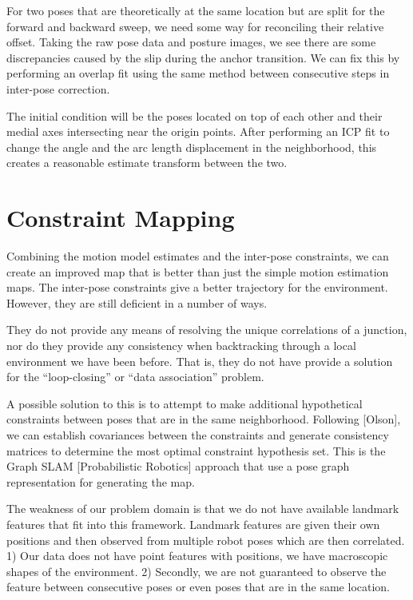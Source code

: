 For two poses that are theoretically at the same location but are split for the forward and backward sweep, we need some way for reconciling their relative offset. Taking the raw pose data and posture images, we see there are some discrepancies caused by the slip during the anchor transition. We can fix this by performing an overlap fit using the same method between consecutive steps in inter-pose correction.

The initial condition will be the poses located on top of each other and their medial axes intersecting near the origin points. After performing an ICP fit to change the angle and the arc length displacement in the neighborhood, this creates a reasonable estimate transform between the two.

\section{Constraint Mapping}
\label{constraintmapping}

Combining the motion model estimates and the inter-pose constraints, we can create an improved map that is better than just the simple motion estimation maps. The inter-pose constraints give a better trajectory for the environment. However, they are still deficient in a number of ways.

They do not provide any means of resolving the unique correlations of a junction, nor do they provide any consistency when backtracking through a local environment we have been before. That is, they do not have provide a solution for the “loop-closing” or “data association” problem.

A possible solution to this is to attempt to make additional hypothetical constraints between poses that are in the same neighborhood. Following [Olson], we can establish covariances between the constraints and generate consistency matrices to determine the most optimal constraint hypothesis set. This is the Graph SLAM [Probabilistic Robotics] approach that use a pose graph representation for generating the map.

The weakness of our problem domain is that we do not have available landmark features that fit into this framework. Landmark features are given their own positions and then observed from multiple robot poses which are then correlated. 1) Our data does not have point features with positions, we have macroscopic shapes of the environment. 2) Secondly, we are not guaranteed to observe the feature between consecutive poses or even poses that are in the same location. 

